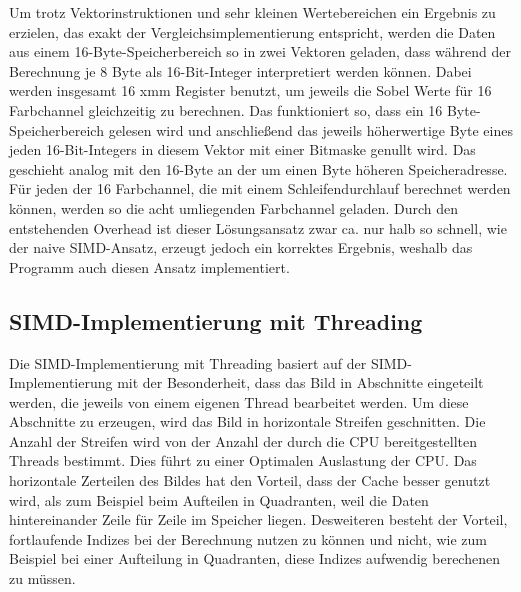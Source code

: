 \documentclass[course=erap]{aspdoc}
\begin{document}
Um trotz Vektorinstruktionen und sehr kleinen Wertebereichen ein Ergebnis zu erzielen,
das exakt der Vergleichsimplementierung entspricht, werden die Daten aus einem 16-Byte-Speicherbereich so in zwei Vektoren geladen, dass während der Berechnung je 8 Byte
als 16-Bit-Integer interpretiert werden können.
Dabei werden insgesamt 16 xmm Register benutzt, um jeweils die Sobel Werte für 16 Farbchannel gleichzeitig zu berechnen.
Das funktioniert so, dass ein 16 Byte-Speicherbereich gelesen wird und anschließend das jeweils höherwertige Byte eines jeden
16-Bit-Integers in diesem Vektor mit einer Bitmaske genullt wird.
Das geschieht analog mit den 16-Byte an der um einen Byte höheren Speicheradresse.
Für jeden der 16 Farbchannel, die mit einem Schleifendurchlauf berechnet werden können, werden so die acht umliegenden Farbchannel geladen.
Durch den entstehenden Overhead ist dieser Lösungsansatz zwar ca. nur halb so schnell, wie der naive SIMD-Ansatz, erzeugt jedoch ein korrektes Ergebnis, weshalb das Programm auch diesen Ansatz implementiert.

\subsection{SIMD-Implementierung mit Threading}
\label{sec:simd-threading}
Die SIMD-Implementierung mit Threading basiert auf der SIMD-Implementierung mit der Besonderheit, dass das Bild in Abschnitte eingeteilt werden, die jeweils von einem eigenen Thread bearbeitet werden.
Um diese Abschnitte zu erzeugen, wird das Bild in horizontale Streifen geschnitten.
Die Anzahl der Streifen wird von der Anzahl der durch die CPU bereitgestellten Threads bestimmt.
Dies führt zu einer Optimalen Auslastung der CPU.
Das horizontale Zerteilen des Bildes hat den Vorteil, dass der Cache besser genutzt wird, als zum Beispiel beim Aufteilen in Quadranten, weil die Daten hintereinander Zeile für Zeile im Speicher liegen.
Desweiteren besteht der Vorteil, fortlaufende Indizes bei der Berechnung nutzen zu können und nicht, wie zum Beispiel bei einer Aufteilung in Quadranten, diese Indizes aufwendig berechenen zu müssen.
\end{document}
